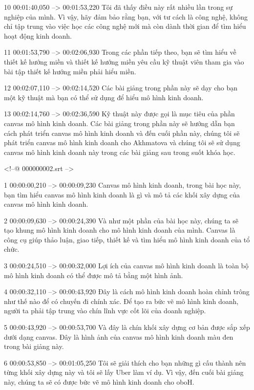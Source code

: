 10
00:01:40,050 --> 00:01:53,220
Tôi đã thấy điều này rất nhiều lần trong sự nghiệp của mình.  Vì vậy, hãy đảm bảo rằng bạn, với tư cách là công nghệ, không chỉ tập trung vào việc học các công nghệ mới mà còn dành thời gian để tìm hiểu hoạt động kinh doanh.

11
00:01:53,790 --> 00:02:06,930
Trong các phần tiếp theo, bạn sẽ tìm hiểu về thiết kế hướng miền và thiết kế hướng miền yêu cầu kỹ thuật viên tham gia vào bài tập thiết kế hướng miền phải hiểu miền.

12
00:02:07,110 --> 00:02:14,520
Các bài giảng trong phần này sẽ dạy cho bạn một kỹ thuật mà bạn có thể sử dụng để hiểu mô hình kinh doanh.

13
00:02:14,760 --> 00:02:36,590
Kỹ thuật này được gọi là mục tiêu của phần canvas mô hình kinh doanh.  Các bài giảng trong phần này sẽ hướng dẫn bạn cách phát triển canvas mô hình kinh doanh và đến cuối phần này, chúng tôi sẽ phát triển canvas mô hình kinh doanh cho Akhmatova và chúng tôi sẽ sử dụng canvas mô hình kinh doanh này trong các bài giảng sau trong suốt khóa học.

<!--@ 000000002.srt -->

1
00:00:00,210 --> 00:00:09,230
Canvas mô hình kinh doanh, trong bài học này, bạn tìm hiểu canvas mô hình kinh doanh là gì và mô tả các khối xây dựng của canvas mô hình kinh doanh.

2
00:00:09,630 --> 00:00:24,390
Và như một phần của bài học này, chúng ta sẽ tạo khung mô hình kinh doanh cho mô hình kinh doanh của mình.  Canvas là công cụ giúp thảo luận, giao tiếp, thiết kế và tìm hiểu mô hình kinh doanh của tổ chức.

3
00:00:24,510 --> 00:00:32,000
Lợi ích của canvas mô hình kinh doanh là toàn bộ mô hình kinh doanh có thể được mô tả bằng một hình ảnh.

4
00:00:32,110 --> 00:00:43,920
Đây là cách mô hình kinh doanh hoàn chỉnh trông như thế nào để có chuyến đi chính xác.  Để tạo ra bức vẽ mô hình kinh doanh, người ta phải tập trung vào chín lĩnh vực cốt lõi của doanh nghiệp.

5
00:00:43,920 --> 00:00:53,700
Và đây là chín khối xây dựng cơ bản được sắp xếp dưới dạng canvas.  Đây là hình ảnh của canvas mô hình kinh doanh màu đen trong bài giảng này.

6
00:00:53,850 --> 00:01:05,250
Tôi sẽ giải thích cho bạn những gì cấu thành nên từng khối xây dựng này và tôi sẽ lấy Uber làm ví dụ.  Vì vậy, đến cuối bài giảng này, chúng ta sẽ có được bức vẽ mô hình kinh doanh cho oboH.

